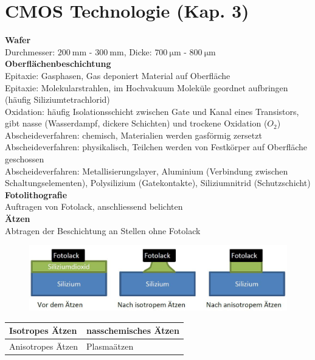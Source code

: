 
\section{CMOS Technologie (Kap. 3)}

\begin{minipage}[t]{0.5\textwidth}
	\textbf{Wafer}\\
	Durchmesser: $\SI{200}{\milli \meter}$ - $\SI{300}{\milli \meter}$, Dicke: $\SI{700}{\micro \meter}$ - $\SI{800}{\micro \meter}$ \\
	\textbf{Oberflächenbeschichtung}\\
	Epitaxie: Gasphasen, Gas deponiert Material auf Oberfläche\\ 
	Epitaxie: Molekularstrahlen, im Hochvakuum Moleküle geordnet aufbringen (häufig Siliziumtetrachlorid) \\
	Oxidation: häufig Isolationsschicht zwischen Gate und Kanal eines Transistors, gibt nasse (Wasserdampf, dickere Schichten) und trockene Oxidation ($O_2$) \\
	Abscheideverfahren: chemisch, Materialien werden gasförmig zersetzt \\
	Abscheideverfahren: physikalisch, Teilchen werden von Festkörper auf Oberfläche geschossen\\
	Abscheideverfahren: Metallisierungslayer, Aluminium (Verbindung zwischen Schaltungselementen), Polysilizium (Gatekontakte), Siliziumnitrid (Schutzschicht) \\
	\textbf{Fotolithografie}\\
	Auftragen von Fotolack, anschliessend belichten\\ 
	\textbf{Ätzen}\\
	Abtragen der Beschichtung an Stellen ohne Fotolack
	\begin{figure}[H]
		\includegraphics[width=0.8\linewidth]{chapters/Technologie/images/Aetzen}
	\end{figure}
	\begin{tabular}{|l|l|}
		\hline
		Isotropes Ätzen&nasschemisches Ätzen\\ \hline
		Anisotropes Ätzen&Plasmaätzen\\ \hline
	\end{tabular}\\ 
\end{minipage}
